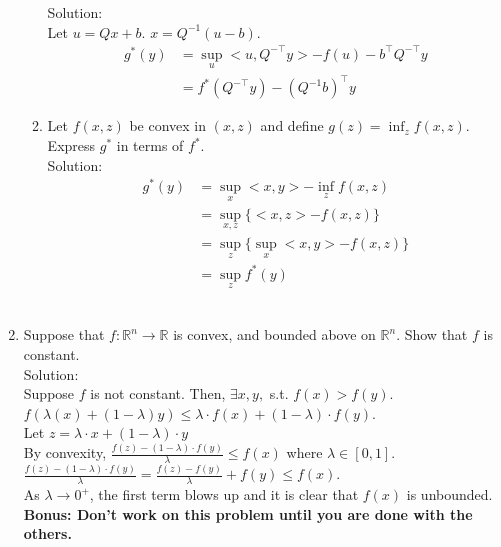 \documentclass[12pt]{amsart}
\begin{document}
\begin{enumerate}
\begin{enumerate}
\noindent
Solution:\\
Let $u = Qx + b$.  $x = Q^{-1}(u-b)$.
\begin{align*}
g^*(y) &= \sup_u <u, Q^{-\top} y> - f(u) - b^\top Q^{-\top} y\\
          &= f^*(Q^{-\top}y) - (Q^{-1} b)^\top y
\end{align*}

\item Let $f(x,z)$ be convex in $(x,z)$ and define $g(z) = \inf_z f(x,z)$. Express $g^*$ in terms of $f^*$.\\

\noindent
Solution:\\
\begin{align*}
g^*(y) &= \sup_x <x,y> - \inf_z f(x,z)\\
          &= \sup_{x,z} \{<x,z> - f(x,z)\}\\
	  &= \sup_z \{\sup_x <x,y> - f(x,z)\}\\
          &= \sup_z f^*(y)
\end{align*}\\
\end{enumerate}



\item Suppose that $f: \mathbb{R}^n \rightarrow \mathbb{R}$ is convex, and bounded above on $\mathbb{R}^n$. Show that $f$ is constant. \\

\noindent
Solution:\\
Suppose $f$ is not constant.  Then, $\exists x,y,$ s.t. $f(x) > f(y).$\\
$f(\lambda(x) + (1-\lambda)y) \leq \lambda \cdot f(x) + (1-\lambda) \cdot f(y)$.\\
Let $z = \lambda \cdot x + (1-\lambda) \cdot y$\\
By convexity, $\displaystyle \frac{f(z) - (1-\lambda) \cdot f(y)}{\lambda} \leq f(x)$ where $\lambda \in [0,1]$. \\

\noindent
$\displaystyle \frac{f(z) - (1-\lambda) \cdot f(y)}{\lambda} = \frac{f(z)-f(y)}{\lambda} + f(y) \leq f(x)$. \\

\noindent
As $\lambda \rightarrow 0^+$, the first term blows up and it is clear that $f(x)$ is unbounded.\\

\noindent
{\bf Bonus: Don't work on this problem until you are done with the others. }


\end{enumerate}
\end{document}

